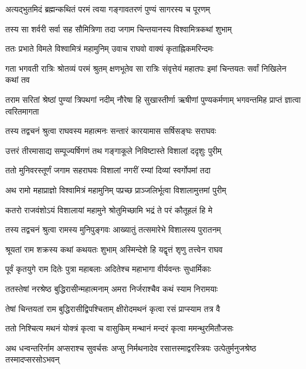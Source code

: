 \twolineshloka
{अत्यद्भुतमिदं ब्रह्मन्कथितं परमं त्वया}
{गङ्गावतरणं पुण्यं सागरस्य च पूरणम्} %

\twolineshloka
{तस्य सा शर्वरी सर्वा सह सौमित्रिणा तदा}
{जगाम चिन्तयानस्य विश्वामित्रकथां शुभाम्} %

\twolineshloka
{ततः प्रभाते विमले विश्वामित्रं महामुनिम्}
{उवाच राघवो वाक्यं कृताह्निकमरिन्दमः} %

\threelineshloka
{गता भगवती रात्रिः श्रोतव्यं परमं श्रुतम्}
{क्षणभूतेव सा रात्रिः संवृत्तेयं महातपः}
{इमां चिन्तयतः सर्वां निखिलेन कथां तव} %

\threelineshloka
{तराम सरितां श्रेष्ठां पुण्यां त्रिपथगां नदीम्}
{नौरेषा हि सुखास्तीर्णा ऋषीणां पुण्यकर्मणाम्}
{भगवन्तमिह प्राप्तं ज्ञात्वा त्वरितमागता} %

\twolineshloka
{तस्य तद्वचनं श्रुत्वा राघवस्य महात्मनः}
{सन्तारं कारयामास सर्षिसङ्घः सराघवः} %

\twolineshloka
{उत्तरं तीरमासाद्य सम्पूज्यर्षिगणं तथ}
{गङ्गाकूले निविष्टास्ते विशालां ददृशुः पुरीम्} %

\twolineshloka
{ततो मुनिवरस्तूर्णं जगाम सहराघवः}
{विशालां नगरीं रम्यां दिव्यां स्वर्गोपमां तदा} %

\twolineshloka
{अथ रामो महाप्राज्ञो विश्वामित्रं महामुनिम्}
{पप्रच्छ प्राञ्जलिर्भूत्वा विशालामुत्तमां पुरीम्} %

\twolineshloka
{कतरो राजवंशोऽयं विशालायां महामुने}
{श्रोतुमिच्छामि भद्रं ते परं कौतूहलं हि मे} %

\twolineshloka
{तस्य तद्वचनं श्रुत्वा रामस्य मुनिपुङ्गवः}
{आख्यातुं तत्समारेभे विशालस्य पुरातनम्} %

\twolineshloka
{श्रूयतां राम शक्रस्य कथां कथयतः शुभाम्}
{अस्मिन्देशे हि यद्वृत्तं शृणु तत्त्वेन राघव} %

\twolineshloka
{पूर्वं कृतयुगे राम दितेः पुत्रा महाबलाः}
{अदितेश्च महाभागा वीर्यवन्तः सुधार्मिकाः} %

\twolineshloka
{ततस्तेषां नरश्रेष्ठ बुद्धिरासीन्महात्मनाम्}
{अमरा निर्जराश्चैव कथं स्याम निरामयाः} %

\twolineshloka
{तेषां चिन्तयतां राम बुद्धिरासीद्विपश्चिताम्}
{क्षीरोदमथनं कृत्वा रसं प्राप्स्याम तत्र वै} %

\twolineshloka
{ततो निश्चित्य मथनं योक्त्रं कृत्वा च वासुकिम्}
{मन्थानं मन्दरं कृत्वा ममन्थुरमितौजसः} %

\threelineshloka
{अथ धन्वन्तरिर्नाम अप्सराश्च सुवर्चसः}
{अप्सु निर्मथनादेव रसात्तस्माद्वरस्त्रियः}
{उत्पेतुर्मनुजश्रेष्ठ तस्मादप्सरसोऽभवन्} %

